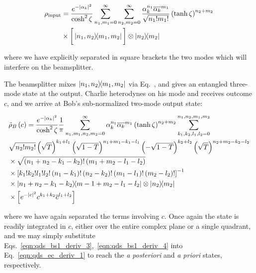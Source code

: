 \begin{align}
\rho_{\text{input}} &= \frac{e^{-\left|\alpha_k\right|^2}}{\cosh^2 \zeta} \sum_{n_1, m_1=0}^\infty \sum_{n_2, m_2=0}^{\infty} \frac{\alpha_k^{n_1} \overline{\alpha_k}^{m_1}}{\sqrt{n_1! m_1!}} \left(\tanh\zeta\right)^{n_2 + m_2} \notag \\
&\times \bigg[\dyad{n_1, n_2}{m_1, m_2}\bigg] \otimes \dyad{n_2}{m_2}
\end{align}

\noindent where we have explicitly separated in square brackets the two modes which will interfere on the beamsplitter.

The beamsplitter mixes $\dyad{n_1, n_2}{m_1, m_2}$ via Eq.~, and gives an entangled three-mode state at the output. Charlie heterodynes on his mode and receives outcome $c$, and we arrive at Bob's sub-normalized two-mode output state:

\begin{align}\label{eqn:qds_ec_deriv_1}
&\tilde{\rho}_{B}\left(c\right) =  \frac{e^{-\left|\alpha_k\right|^2}}{\cosh^2\zeta} \frac{1}{\pi} \sum_{n_1, m_1, n_2, m_2 = 0}^\infty \alpha_k^{n_1} \overline{\alpha_k}^{m_1} \left(\tanh\zeta\right)^{n_2 + m_2} \sum_{k_1, k_2, l_1, l_2 = 0}^{n_1, n_2, m_1, m_2}  \notag \\
%
&\sqrt{n_2! m_2!} \left(\sqrt{T}\right)^{k_1 + l_1} \left(\sqrt{1-T}\right)^{n_1 + m_1 - k_1 - l_1} \left(-\sqrt{1-T}\right)^{k_2 + l_2} \left(\sqrt{T}\right)^{n_2 + m_2 - k_2 - l_2} \notag \\
%
&\times \sqrt{\left(n_1 + n_2 - k_1 - k_2\right)! \left(m_1 + m_2 - l_1 - l_2\right)} \notag \\
%
&\times \left[k_1! k_2! l_1! l_2! \left(n_1 - k_1\right)! \left(n_2 - k_2\right)! \left(m_1 - l_1\right)! \left(m_2 - l_2\right)! \right]^{-1} \notag \\
%
&\times \dyad{n_1 + n_2 - k_1 - k_2}{m-1 + m_2 - l_1 - l_2} \otimes \dyad{n_2}{m_2} \notag \\
%
&\times \left[e^{-\left|c\right|^2} c^{k_1 + k_2} \overline{c}^{l_1 + l_2} \right]
\end{align}

\noindent where we have again separated the terms involving $c$. Once again the state is readily integrated in $c$, either over the entire complex plane or a single quadrant, and we may simply substitute Eqs.~\ref{eqn:qds_bs1_deriv_3},~\ref{eqn:qds_bs1_deriv_4} into Eq.~\ref{eqn:qds_ec_deriv_1} to reach the \emph{a posteriori} and \emph{a priori} states, respectively.


